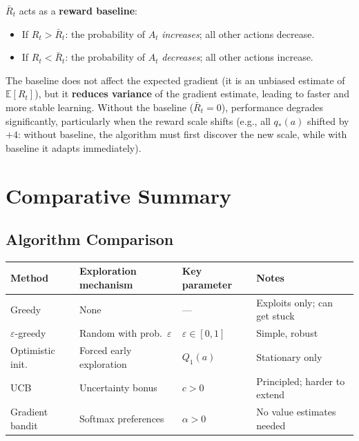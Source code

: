 \documentclass[11pt,a4paper]{article}
\theoremstyle{definition}
\theoremstyle{plain}
\theoremstyle{remark}
\begin{document}
$\bar{R}_t$ acts as a \textbf{reward baseline}:
\begin{itemize}
    \item If $R_t > \bar{R}_t$: the probability of $A_t$ \emph{increases}; all other actions decrease.
    \item If $R_t < \bar{R}_t$: the probability of $A_t$ \emph{decreases}; all other actions increase.
\end{itemize}

The baseline does not affect the expected gradient (it is an unbiased estimate of $\mathbb{E}[R_t]$), but it \textbf{reduces variance} of the gradient estimate, leading to faster and more stable learning. Without the baseline ($\bar{R}_t = 0$), performance degrades significantly, particularly when the reward scale shifts (e.g., all $q_*(a)$ shifted by $+4$: without baseline, the algorithm must first discover the new scale, while with baseline it adapts immediately).

\section{Comparative Summary}

\subsection{Algorithm Comparison}

\begin{center}
\begin{tabular}{llll}
\hline
\textbf{Method} & \textbf{Exploration mechanism} & \textbf{Key parameter} & \textbf{Notes} \\
\hline
Greedy            & None                        & ---         & Exploits only; can get stuck \\
$\varepsilon$-greedy  & Random with prob.\ $\varepsilon$ & $\varepsilon \in [0,1]$ & Simple, robust \\
Optimistic init.  & Forced early exploration     & $Q_1(a)$    & Stationary only \\
UCB               & Uncertainty bonus           & $c > 0$     & Principled; harder to extend \\
Gradient bandit   & Softmax preferences         & $\alpha > 0$ & No value estimates needed \\
\hline
\end{tabular}
\end{center}
\end{document}
